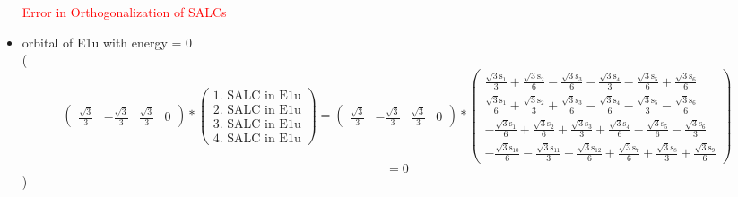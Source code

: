 \documentclass[12pt,a4paper]{article}
\begin{document}
\begin{itemize}
\textcolor{red}{Error in Orthogonalization of SALCs}\item orbital of E1u with energy = 
                                $0$ \\
( 
$$
\begin{pmatrix}\frac{\sqrt{3}}{3} & - \frac{\sqrt{3}}{3} & \frac{\sqrt{3}}{3} & 0\end{pmatrix} * \left(\begin{array}{c}\text{1. SALC in E1u} \\ \text{2. SALC in E1u} \\ \text{3. SALC in E1u} \\ \text{4. SALC in E1u}\end{array}\right) = \begin{pmatrix}\frac{\sqrt{3}}{3} & - \frac{\sqrt{3}}{3} & \frac{\sqrt{3}}{3} & 0\end{pmatrix} * \begin{pmatrix}\frac{\sqrt{3} \text{s}_{1}}{3} + \frac{\sqrt{3} \text{s}_{2}}{6} - \frac{\sqrt{3} \text{s}_{3}}{6} - \frac{\sqrt{3} \text{s}_{4}}{3} - \frac{\sqrt{3} \text{s}_{5}}{6} + \frac{\sqrt{3} \text{s}_{6}}{6}\\\frac{\sqrt{3} \text{s}_{1}}{6} + \frac{\sqrt{3} \text{s}_{2}}{3} + \frac{\sqrt{3} \text{s}_{3}}{6} - \frac{\sqrt{3} \text{s}_{4}}{6} - \frac{\sqrt{3} \text{s}_{5}}{3} - \frac{\sqrt{3} \text{s}_{6}}{6}\\- \frac{\sqrt{3} \text{s}_{1}}{6} + \frac{\sqrt{3} \text{s}_{2}}{6} + \frac{\sqrt{3} \text{s}_{3}}{3} + \frac{\sqrt{3} \text{s}_{4}}{6} - \frac{\sqrt{3} \text{s}_{5}}{6} - \frac{\sqrt{3} \text{s}_{6}}{3}\\- \frac{\sqrt{3} \text{s}_{10}}{6} - \frac{\sqrt{3} \text{s}_{11}}{3} - \frac{\sqrt{3} \text{s}_{12}}{6} + \frac{\sqrt{3} \text{s}_{7}}{6} + \frac{\sqrt{3} \text{s}_{8}}{3} + \frac{\sqrt{3} \text{s}_{9}}{6}\end{pmatrix} 
 $$ $$ = 0 
 $$ 
 )


\end{itemize}
\end{document}
